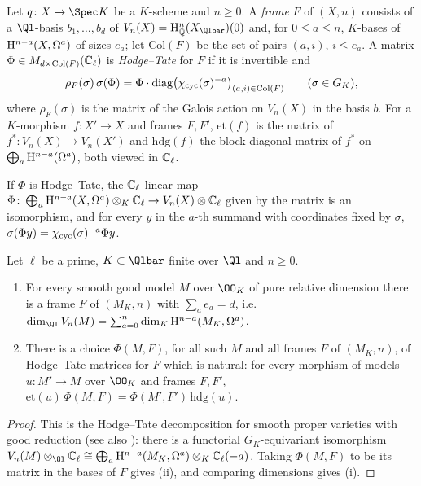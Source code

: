 \begin{definition}\label{pf:steps1:def:frame}
Let $q\colon X\to\Spec K$ be a $K$-scheme and $n\ge0$. A \emph{frame} $F$ of $(X,n)$ consists of a
$\Ql$-basis $b_1,\dots,b_d$ of $V_n(X)=\stepsIHQ^n(X_{\Qlbar})(0)$ and, for $0\le a\le n$, $K$-bases of
$\mathrm{H}^{n-a}(X,\Omega^a)$ of sizes $e_a$; let $\mathrm{Col}(F)$ be the set of pairs $(a,i)$, $i\le e_a$. A
matrix $\Phi\in M_{d\times\mathrm{Col}(F)}(\mathbb{C}_\ell)$ is \emph{Hodge--Tate} for $F$ if it is invertible and
\[
 \rho_F(\sigma)\,\sigma(\Phi)=\Phi\cdot\mathrm{diag}\bigl(\chi_{\mathrm{cyc}}(\sigma)^{-a}\bigr)_{(a,i)\in\mathrm{Col}(F)}
 \qquad(\sigma\in G_K),
\]
where $\rho_F(\sigma)$ is the matrix of the Galois action on $V_n(X)$ in the basis $b$. For a $K$-morphism
$f\colon X'\to X$ and frames $F,F'$, $\mathrm{et}(f)$ is the matrix of $f^*\colon V_n(X)\to V_n(X')$ and
$\mathrm{hdg}(f)$ the block diagonal matrix of $f^*$ on $\bigoplus_a\mathrm{H}^{n-a}(\Omega^a)$, both viewed in
$\mathbb{C}_\ell$.  
\end{definition}

If $\Phi$ is Hodge--Tate, the $\mathbb{C}_\ell$-linear map $\Phi\colon\bigoplus_a\mathrm{H}^{n-a}(X,\Omega^a)\otimes_K\mathbb{C}_\ell
\to V_n(X)\otimes\mathbb{C}_\ell$ given by the matrix is an isomorphism, and for every $y$ in the $a$-th summand with
coordinates fixed by $\sigma$, $\sigma(\Phi y)=\chi_{\mathrm{cyc}}(\sigma)^{-a}\Phi y$.

\begin{theorem}\label{pf:steps1:htspec}
Let $\ell$ be a prime, $K\subset\Qlbar$ finite over $\Ql$ and $n\ge0$.
\begin{enumerate}[label=\textup{(\roman*)},nosep]
\item For every smooth good model $M$ over $\OO_K$ of pure relative dimension there is a frame $F$ of
  $(M_K,n)$ with $\sum_ae_a=d$, i.e.\ $\dim_{\Ql}V_n(M)=\sum_{a=0}^n\dim_K\stepsIH^{n-a}(M_K,\Omega^a)$.
\item There is a choice $\Phi(M,F)$, for all such $M$ and all frames $F$ of $(M_K,n)$, of Hodge--Tate matrices
  for $F$ which is natural: for every morphism of models $u\colon M'\to M$ over $\OO_K$ and frames $F,F'$,
  $\mathrm{et}(u)\,\Phi(M,F)=\Phi(M',F')\,\mathrm{hdg}(u)$.
\end{enumerate}
\end{theorem}

\begin{proof}
This is the Hodge--Tate decomposition for smooth proper varieties with good reduction \cite{Faltings1988}
(see also \cite{Scholze2013phodge}): there is a functorial $G_K$-equivariant isomorphism
$V_n(M)\otimes_{\Ql}\stepsICl\cong\bigoplus_a\stepsIH^{n-a}(M_K,\Omega^a)\otimes_K\stepsICl(-a)$. Taking
$\Phi(M,F)$ to be its matrix in the bases of $F$ gives (ii), and comparing dimensions gives (i).
\end{proof}

